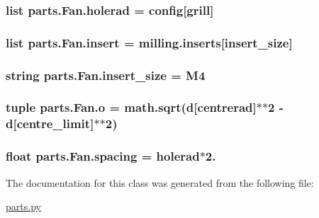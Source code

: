 \subsubsection[{holerad}]{\setlength{\rightskip}{0pt plus 5cm}list parts.\+Fan.\+holerad = config\mbox{[}\textquotesingle{}grill\textquotesingle{}\mbox{]}\hspace{0.3cm}{\ttfamily [static]}}\label{classparts_1_1_fan_a75666d4a0b6dd74f07fe5e84394aa116}
\hypertarget{classparts_1_1_fan_a6737154f9b7459e8f98b5b737fcd8733}{}
\subsubsection[{insert}]{\setlength{\rightskip}{0pt plus 5cm}list parts.\+Fan.\+insert = milling.\+inserts\mbox{[}{\bf insert\+\_\+size}\mbox{]}\hspace{0.3cm}{\ttfamily [static]}}\label{classparts_1_1_fan_a6737154f9b7459e8f98b5b737fcd8733}
\hypertarget{classparts_1_1_fan_a991d1caf4a1338f8acb1010c27ebc1da}{}
\subsubsection[{insert\+\_\+size}]{\setlength{\rightskip}{0pt plus 5cm}string parts.\+Fan.\+insert\+\_\+size = \textquotesingle{}M4\textquotesingle{}\hspace{0.3cm}{\ttfamily [static]}}\label{classparts_1_1_fan_a991d1caf4a1338f8acb1010c27ebc1da}
\hypertarget{classparts_1_1_fan_a33929017332f1dd8d2bac914a8733cee}{}
\subsubsection[{o}]{\setlength{\rightskip}{0pt plus 5cm}tuple parts.\+Fan.\+o = math.\+sqrt({\bf d}\mbox{[}\textquotesingle{}centrerad\textquotesingle{}\mbox{]}$\ast$$\ast$2 -\/ {\bf d}\mbox{[}\textquotesingle{}centre\+\_\+limit\textquotesingle{}\mbox{]}$\ast$$\ast$2)\hspace{0.3cm}{\ttfamily [static]}}\label{classparts_1_1_fan_a33929017332f1dd8d2bac914a8733cee}
\hypertarget{classparts_1_1_fan_a23a5526fd6959e6fe44589d052682801}{}
\subsubsection[{spacing}]{\setlength{\rightskip}{0pt plus 5cm}float parts.\+Fan.\+spacing = {\bf holerad}$\ast$2.\hspace{0.3cm}{\ttfamily [static]}}\label{classparts_1_1_fan_a23a5526fd6959e6fe44589d052682801}


The documentation for this class was generated from the following file\+:\begin{DoxyCompactItemize}
\item 
\hyperlink{parts_8py}{parts.\+py}\end{DoxyCompactItemize}
